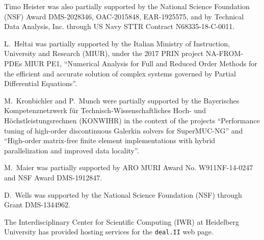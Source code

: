 \documentclass{ansarticle-preprint}
\newcommand{\specialword}[1]{\texttt{#1}}
\newcommand{\dealii}{{\specialword{deal.II}}\xspace}
\begin{document}
Timo Heister was also partially supported by the National Science Foundation (NSF)
Award DMS-2028346, OAC-2015848, EAR-1925575, and by
Technical Data Analysis, Inc. through US Navy STTR Contract N68335-18-C-0011.

L.~Heltai was partially supported by the Italian Ministry of Instruction,
University and Research (MIUR), under the 2017 PRIN project NA-FROM-PDEs MIUR
PE1, ``Numerical Analysis for Full and Reduced Order Methods for the efficient
and accurate solution of complex systems governed by Partial Differential
Equations''.

M.~Kronbichler and P.~Munch were partially supported by the
Bayerisches Kompetenznetzwerk
f\"ur Technisch-Wissen\-schaft\-li\-ches Hoch- und H\"ochstleistungsrechnen
(KONWIHR) in the context of the projects
``Performance tuning of high-order discontinuous Galerkin solvers for
SuperMUC-NG'' and ``High-order matrix-free finite element implementations with
hybrid parallelization and improved data locality''.

M.~Maier was partially supported by ARO MURI Award No. W911NF-14-0247 and
NSF Award DMS-1912847.

D.~Wells was supported by the National Science Foundation (NSF) through Grant
DMS-1344962.

The Interdisciplinary Center for Scientific Computing (IWR) at Heidelberg
University has provided hosting services for the \dealii{} web page.


{}

\end{document}
